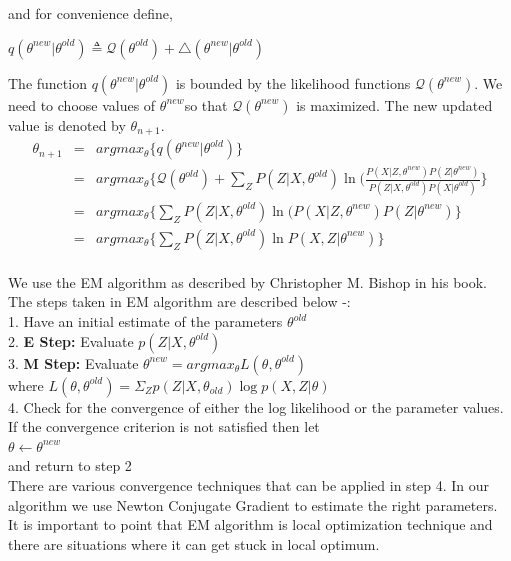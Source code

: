 \documentclass[12pt]{dalcsthesis}
\begin{document}
and for convenience define,

$q(\theta^{new}|\theta^{old})\triangleq\mathcal{Q}(\theta^{old})+\triangle(\theta^{new}|\theta^{old})$

The function $q(\theta^{new}|\theta^{old})$ is bounded by the likelihood
functions $\mathcal{Q}(\theta^{new})$. We need to choose values of
$\theta^{new}$so that $\mathcal{Q}(\theta^{new})$ is maximized.
The new updated value is denoted by $\theta_{n+1}.$
\begin{eqnarray}
\theta_{n+1} & = & argmax_{\theta}\{q(\theta^{new}|\theta^{old})\}\\
 & = & argmax_{\theta}\{\mathcal{Q}(\theta^{old})+\sum_{Z}P(Z|X,\theta^{old})\ln(\frac{P(X|Z,\theta^{new})P(Z|\theta^{new})}{P(Z|X,\theta^{old})P(X|\theta^{old})}\}\\
 & = & argmax_{\theta}\{\sum_{Z}P(Z|X,\theta^{old})\ln(P(X|Z,\theta^{new})P(Z|\theta^{new})\}\\
 & = & argmax_{\theta}\{\sum_{Z}P(Z|X,\theta^{old})\ln P(X,Z|\theta^{new})\}\\
\end{eqnarray}

We use the EM algorithm as described by Christopher M. Bishop\cite{bishop2006pattern} in his book. The steps taken in EM algorithm are described below -:
\\
1. Have an initial estimate of the parameters $\theta ^{old}$
\\
2. \textbf{E Step:} Evaluate $p(Z|X,\theta^{old})$
\\
3. \textbf{M Step:} Evaluate $\theta ^{new} = arg max _{\theta} L(\theta,\theta^{old})$
\\
\hspace*{20 mm} where 
$L(\theta,\theta^{old})=\Sigma _{Z} p(Z|X,\theta_{old}) \log p(X,Z|\theta)$
\\
4. Check for the convergence of either the log likelihood or the parameter values. If the convergence criterion is not satisfied then let
\\
\hspace*{20 mm} $\theta \leftarrow \theta^{new} $
\\
and return to step 2
\\
There are various convergence techniques that can be applied in step 4. In our algorithm we use Newton Conjugate Gradient to estimate the right parameters. It is important to point that EM algorithm is local optimization technique and there are situations where it can get stuck in local optimum. 		
\end{document}
